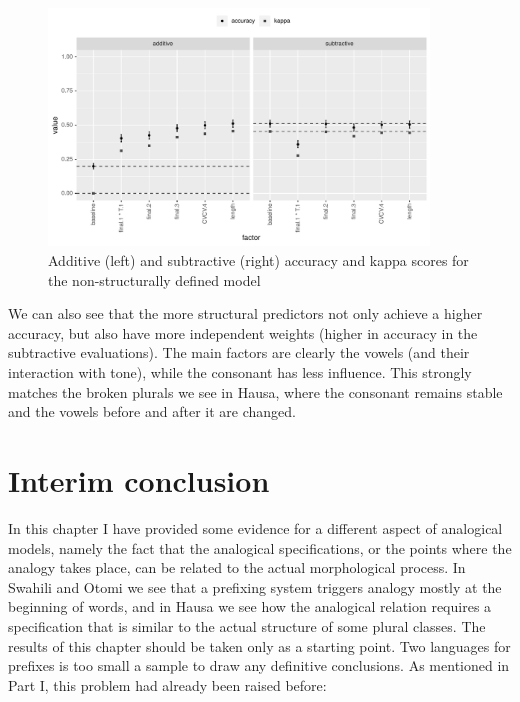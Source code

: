 \begin{figure}
    \centering
    \includegraphics[width=0.9\textwidth]{./figures/hausa/nostruc-overall.pdf}
    \caption{Additive (left) and subtractive (right) accuracy and kappa scores for the non-structurally defined model}\label{fig:nostruc-overall}
\end{figure}

\largerpage
We can also see that the more structural predictors not only achieve a higher accuracy, but also have more independent weights (higher in accuracy in the subtractive evaluations). The main factors are clearly the vowels (and their interaction with tone), while the consonant has less influence. This strongly matches the broken plurals we see in Hausa, where the consonant remains stable and the vowels before and after it are changed.


\section{Interim conclusion}

In this chapter I have provided some evidence for a different aspect of analogical models, namely the fact that the analogical specifications, or the points where the analogy takes place, can be related to the actual morphological process. In Swahili and Otomi we see that a prefixing system triggers analogy mostly at the beginning of words, and in Hausa we see how the analogical relation requires a specification that is similar to the actual structure of some plural classes. The results of this chapter should be taken only as a starting point. Two languages for prefixes is too small a sample to draw any definitive conclusions. As mentioned in Part I, this problem had already been raised before:

